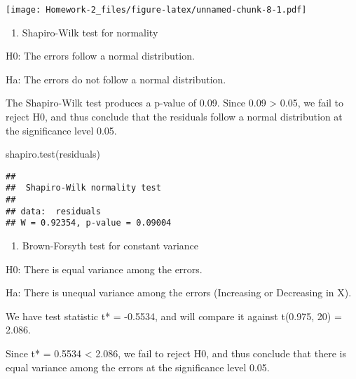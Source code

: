 \documentclass[
]{article}
\newenvironment{Shaded}{\begin{snugshade}}{\end{snugshade}}
\newcommand{\FunctionTok}[1]{\textcolor[rgb]{0.00,0.00,0.00}{#1}}
\newcommand{\NormalTok}[1]{#1}
\providecommand{\tightlist}{%
  \setlength{\itemsep}{0pt}\setlength{\parskip}{0pt}}
\begin{document}
\texttt{[image: Homework-2\_files/figure-latex/unnamed-chunk-8-1.pdf]}

\begin{enumerate}
\def\labelenumi{\alph{enumi})}
\setcounter{enumi}{5}
\tightlist
\item
  Shapiro-Wilk test for normality
\end{enumerate}

H0: The errors follow a normal distribution.

Ha: The errors do not follow a normal distribution.

The Shapiro-Wilk test produces a p-value of 0.09. Since 0.09
\textgreater{} 0.05, we fail to reject H0, and thus conclude that the
residuals follow a normal distribution at the significance level 0.05.

\begin{Shaded}
\begin{Highlighting}[]
\FunctionTok{shapiro.test}\NormalTok{(residuals)}
\end{Highlighting}
\end{Shaded}

\begin{verbatim}
## 
##  Shapiro-Wilk normality test
## 
## data:  residuals
## W = 0.92354, p-value = 0.09004
\end{verbatim}

\begin{enumerate}
\def\labelenumi{\alph{enumi})}
\setcounter{enumi}{6}
\tightlist
\item
  Brown-Forsyth test for constant variance
\end{enumerate}

H0: There is equal variance among the errors.

Ha: There is unequal variance among the errors (Increasing or Decreasing
in X).

We have test statistic t* = -0.5534, and will compare it against
t(0.975, 20) = 2.086.

Since \textbar t*\textbar{} = 0.5534 \textless{} 2.086, we fail to
reject H0, and thus conclude that there is equal variance among the
errors at the significance level 0.05.
\end{document}
